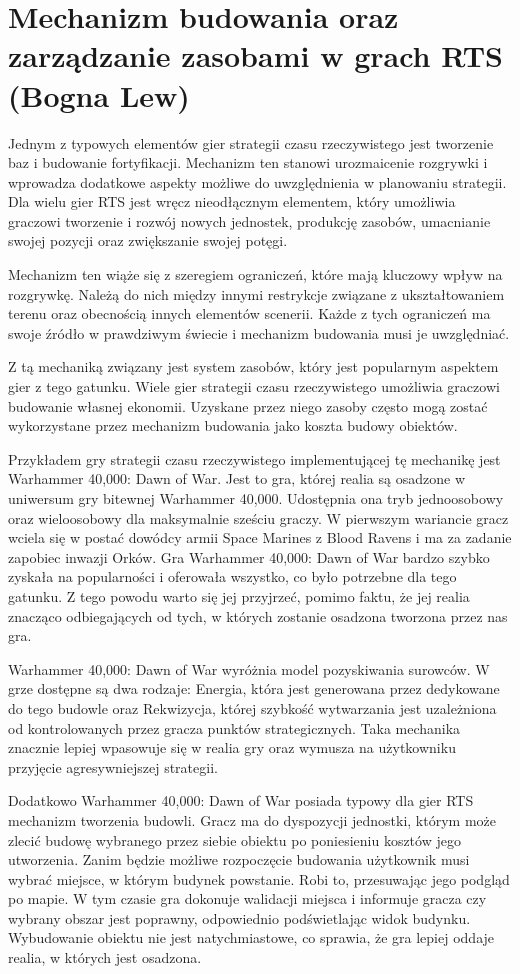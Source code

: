 \section{Mechanizm budowania oraz zarządzanie zasobami w grach RTS (Bogna Lew)}\label{s:budowanie}
Jednym z typowych elementów gier strategii czasu rzeczywistego  jest tworzenie baz i budowanie fortyfikacji. Mechanizm
ten stanowi urozmaicenie rozgrywki i wprowadza dodatkowe aspekty możliwe do uwzględnienia w planowaniu strategii. Dla
wielu gier RTS jest wręcz nieodłącznym elementem, który umożliwia graczowi tworzenie i rozwój nowych jednostek,
produkcję zasobów, umacnianie swojej pozycji oraz zwiększanie swojej potęgi.

Mechanizm ten wiąże się z szeregiem ograniczeń, które mają kluczowy wpływ na rozgrywkę. Należą do nich między innymi
restrykcje związane z ukształtowaniem terenu oraz obecnością innych elementów scenerii. Każde z tych ograniczeń ma
swoje źródło w prawdziwym świecie i mechanizm budowania musi je uwzględniać.

Z tą mechaniką związany jest system zasobów, który jest popularnym aspektem gier z tego gatunku. Wiele gier strategii
czasu rzeczywistego umożliwia graczowi budowanie własnej ekonomii. Uzyskane przez niego zasoby często mogą zostać
wykorzystane przez mechanizm budowania jako koszta budowy obiektów.

Przykładem gry strategii czasu rzeczywistego implementującej tę mechanikę jest Warhammer 40,000: Dawn of War. Jest to
gra, której realia są osadzone w uniwersum gry bitewnej Warhammer 40,000. Udostępnia ona tryb jednoosobowy oraz
wieloosobowy dla maksymalnie sześciu graczy. W pierwszym wariancie gracz wciela się w postać dowódcy
armii Space Marines z Blood Ravens i ma za zadanie zapobiec inwazji Orków. Gra Warhammer 40,000: Dawn of War bardzo szybko
zyskała na popularności i oferowała wszystko, co było potrzebne dla tego gatunku. Z tego powodu warto się jej przyjrzeć,
pomimo faktu, że jej realia znacząco odbiegających od tych, w których zostanie osadzona tworzona przez nas gra.

Warhammer 40,000: Dawn of War wyróżnia model pozyskiwania surowców. W grze dostępne są dwa rodzaje: Energia, która jest
generowana przez dedykowane do tego budowle oraz Rekwizycja, której szybkość wytwarzania jest uzależniona od kontrolowanych
przez gracza punktów strategicznych. Taka mechanika znacznie lepiej wpasowuje się w realia gry oraz wymusza na użytkowniku
przyjęcie agresywniejszej strategii.

Dodatkowo Warhammer 40,000: Dawn of War posiada typowy dla gier RTS mechanizm tworzenia budowli. Gracz ma
do dyspozycji jednostki, którym może zlecić budowę wybranego przez siebie obiektu po poniesieniu kosztów jego utworzenia.
Zanim będzie możliwe rozpoczęcie budowania użytkownik musi wybrać miejsce, w którym budynek powstanie. Robi to, przesuwając
jego podgląd po mapie. W tym czasie gra dokonuje walidacji miejsca i informuje gracza czy wybrany obszar jest poprawny,
odpowiednio podświetlając widok budynku. Wybudowanie obiektu nie jest natychmiastowe, co sprawia, że gra lepiej oddaje
realia, w których jest osadzona.


